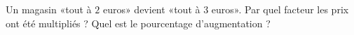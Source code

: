 
\begin{exercice}\label{exoSeconde-0030}

    Un magasin «tout à \( 2\) euros» devient «tout à \( 3\) euros». Par quel facteur les prix ont été multipliés ? Quel est le pourcentage d'augmentation ?

\end{exercice}

